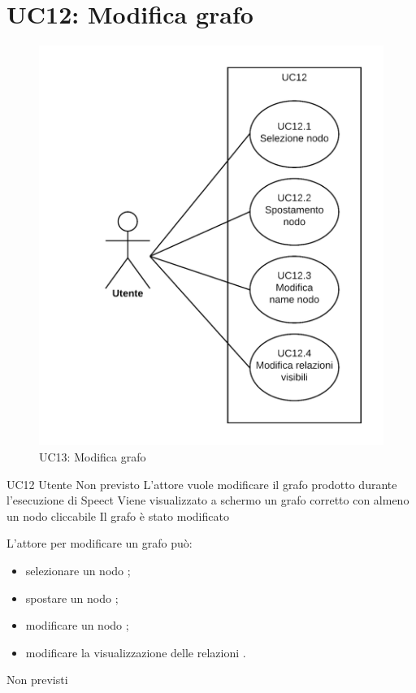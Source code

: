 \documentclass[../AnalisideiRequisiti.tex]{subfiles}
\begin{document}
	\section{UC12: Modifica grafo}
	\begin{figure}[H]
		\centering
		\includegraphics[width=\textwidth]{../img/UC12.png}
		\caption{UC13: Modifica grafo}
	\end{figure}
	\UserCase
	{UC12}
	{Utente}
	{Non previsto}
	{L'attore vuole modificare il grafo prodotto durante l'esecuzione di Speect }
	{Viene visualizzato a schermo un grafo corretto con almeno un nodo cliccabile }
	{Il grafo è stato modificato}
	{
		L'attore per modificare un grafo può:
		\begin{itemize}
			\item{} selezionare un nodo ;
			\item{} spostare un nodo ;
			\item{} modificare un nodo ;
			\item{} modificare la visualizzazione delle relazioni .
		\end{itemize}
	}
	{Non previsti}
	
\end{document}
